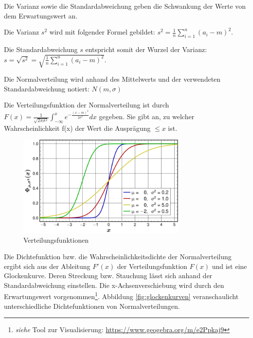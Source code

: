 Die Varianz sowie die Standardabweichung geben die Schwankung der Werte von dem Erwartungswert an.

Die Varianz $s^2$ wird mit folgender Formel gebildet: $s^2 = \frac{1}{n} \sum_{i=1}^n (a_i-m)^2$.

Die Standardabweichung $s$ entspricht somit der Wurzel der Varianz: $s = \sqrt{s^2} = \sqrt{\frac{1}{n} \sum_{i=1}^n (a_i-m)^2}$.

Die Normalverteilung wird anhand des Mittelwerts und der verwendeten Standardabweichung notiert: $N(m, \sigma)$

Die Verteilungsfunktion der Normalverteilung ist durch $F(x) = \frac{1}{\sqrt{2 \pi \sigma^2}} \int_{-\infty}^x e^{-\frac{(x-m)^2}{2 \sigma^2}} dx$ gegeben. Sie gibt an, zu welcher Wahrscheinlichkeit f(x) der Wert die Ausprägung $\le x$ ist.

\begin{figure}[H]
\centering
\includegraphics[width=0.75\textwidth]{img/Verteilungskurven.png}
\caption[Verteilungsfunktionen]{Verteilungsfunktionen\protect\footnotemark}
\label{fig:verteilungskurven}
\end{figure}

Die Dichtefunktion bzw. die Wahrscheinlichkeitsdichte der Normalverteilung ergibt sich aus der Ableitung $F'(x)$ der Verteilungsfunktion $F(x)$ und ist eine Glockenkurve. Deren Streckung bzw. Stauchung lässt sich anhand der Standardabweichung einstellen. Die x-Achsenverschiebung wird durch den Erwartungswert vorgenommen\footnote{\textit{siehe} Tool zur Visualisierung: \url{https://www.geogebra.org/m/e2Ppkaj9}}. Abbildung \ref{fig:glockenkurven} veranschaulicht unterschiedliche Dichtefunktionen von Normalverteilungen.

